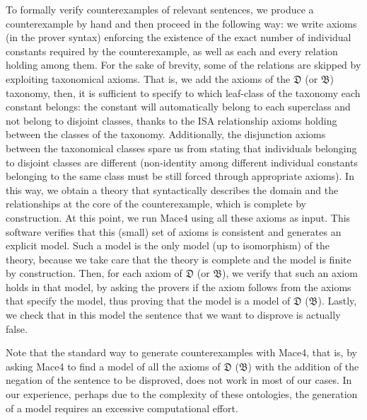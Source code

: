 \documentclass[ao]{iosart2x}
\newcommand{\nb}[1]{\textcolor{red}{$|$}\marginpar{\hspace*{-0cm}\parbox{20mm}{\scriptsize\raggedright\textcolor{red}{#1}}}}
\newcommand {\thdolce} {\ensuremath{\mathfrak{D}}}
\newcommand {\thbfo} {\ensuremath{\mathfrak{B}}}
\begin{document}
To formally verify counterexamples of relevant sentences, we produce a counterexample by hand and then proceed in the following way: we write axioms (in the prover syntax) enforcing the existence of the exact number of individual constants required by the counterexample, as well as each and every relation holding among them. 
For the sake of brevity, some of the relations are skipped by exploiting taxonomical axioms. That is, we add the axioms of the {$\thdolce$} (or  {$\thbfo$}) taxonomy, %
then, it is sufficient to specify to which leaf-class of the taxonomy each constant belongs: the constant will automatically belong to each superclass and not belong to disjoint classes, thanks to the ISA relationship axioms holding between the classes of the taxonomy. Additionally, the disjunction axioms between the taxonomical classes spare us from stating that individuals belonging to disjoint classes are different (non-identity among different individual constants belonging to the same class must be still forced through appropriate axioms). %
In this way, we obtain a theory that syntactically describes the domain and the relationships at the core of the counterexample, which is complete by construction. 
At this point, we run Mace4 using all these axioms as input. %
This software verifies that this (small) set of axioms is consistent and generates an explicit model.
Such a model is the only model (up to isomorphism) of the theory, because we take care that the theory is complete and the model is finite by construction.
Then, for each axiom of {$\thdolce$} (or $\thbfo$), we verify that such an axiom holds in that model, by asking the provers if the axiom follows from the axioms that specify the model, thus proving that the model is a model of {$\thdolce$} ($\thbfo$). %
Lastly, we check that in this model the sentence that we want to disprove is actually false. %

Note that the standard way to generate counterexamples with Mace4, that is, by asking Mace4 to find a model of all the axioms of {$\thdolce$} ($\thbfo$) with the addition of the negation of the sentence to be disproved, does not work in most of our cases. In our experience, perhaps due to the complexity of these ontologies, the generation of a model requires an excessive computational effort.
\end{document}
